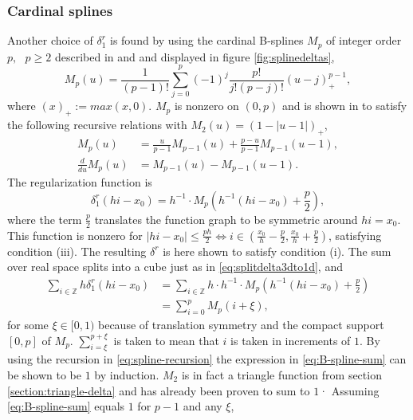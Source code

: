 \documentclass[a4paper,
twoside=false,abstract=false,numbers=noenddot,
titlepage=false,headings=small,parskip=half,version=last]{scrartcl}
\begin{document}
\subsubsection{Cardinal splines}
Another choice of $\delta^r_1$ is found by using the cardinal B-splines $M_p$ of integer order $p,\text{ }p\geq2$ described in \cite{B-spline-paper} and \cite{spectralewald} and displayed in figure \ref{fig:splinedeltas},
\begin{equation}
M_p(u) = \frac{1}{(p-1)!} \sum^p_{j=0} (-1)^j \frac{p!}{j!(p-j)!}(u-j)^{p-1}_+,\label{eq:cardinalspline-definition}
\end{equation}
where $(x)_+ := max(x,0)$.
$M_p$ is nonzero on $(0,p)$ and is shown in \cite{B-spline-paper} to satisfy the following recursive relations with $M_2(u) = (1-|u-1|)_+$,
\begin{align}
M_p(u) &= \frac{u}{p-1}M_{p-1}(u) + \frac{p-u}{p-1}M_{p-1}(u-1),\label{eq:spline-recursion}\\
\frac{d}{du}M_p(u) &= M_{p-1}(u) - M_{p-1}(u-1).\label{eq:spline-derivative-recursion}
\end{align}
The regularization function is
\begin{equation}
\delta^r_1(hi-x_0) = h^{-1}\cdot M_p(h^{-1}(hi-x_0)+\frac{p}{2}),\nonumber
\end{equation}
where the term $\frac{p}{2}$ translates the function graph to be symmetric around $hi=x_0$.
This function is nonzero for $|hi-x_0| \leq \frac{ph}{2} \Leftrightarrow i \in (\frac{x_0}{h}-\frac{p}{2},\frac{x_0}{h}+\frac{p}{2})$, satisfying condition (iii).
The resulting $\delta^r$ is here shown to satisfy condition (i). The sum over real space splits into a cube just as in \eqref{eq:splitdelta3dto1d}, and
\begin{align}
\sum_{i\in \mathbb{Z}}h\delta^{r}_1(hi-x_0) &= \sum_{i\in \mathbb{Z}} h\cdot h^{-1} \cdot M_p(h^{-1}(hi-x_0)+\frac{p}{2})\nonumber\\
		&= \sum_{i=0}^{p} M_p(i+\xi),\label{eq:B-spline-sum}
\end{align}
for some $\xi\in[0,1)$ because of translation symmetry and the compact support $[0,p]$ of $M_p$. $\sum_{i=\xi}^{p+\xi}$ is taken to mean that $i$ is taken in increments of $1$. By using the recursion in \eqref{eq:spline-recursion} the expression in \eqref{eq:B-spline-sum} can be shown to be $1$ by induction.
$M_2$ is in fact a triangle function from section \ref{section:triangle-delta} and has already been proven to sum to $1$· Assuming \eqref{eq:B-spline-sum} equals $1$ for $p-1$ and any $\xi$,
\end{document}
